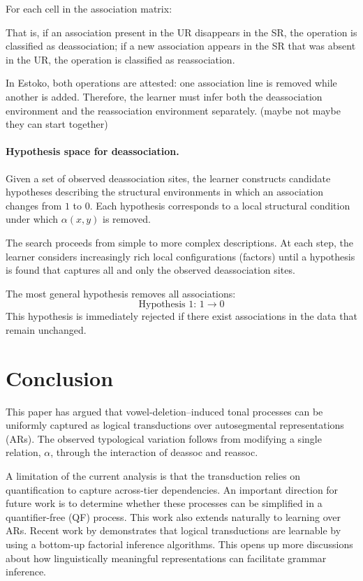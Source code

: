 \documentclass[pmlr]{jmlr}%
\begin{document}
For each cell in the association matrix:


That is, if an association present in the UR disappears in the SR, the
operation is classified as deassociation; if a new association appears
in the SR that was absent in the UR, the operation is classified as
reassociation.

In Estoko, both operations are attested: one association line is
removed while another is added. Therefore, the learner must infer both
the deassociation environment and the reassociation environment
separately. (maybe not maybe they can start together)
\paragraph{Hypothesis space for deassociation.}

Given a set of observed deassociation sites, the learner constructs
candidate hypotheses describing the structural environments in which an
association changes from $1$ to $0$. Each hypothesis corresponds to a
local structural condition under which $\alpha(x,y)$ is removed.

The search proceeds from simple to more complex descriptions. At each
step, the learner considers increasingly rich local configurations
(factors) until a hypothesis is found that captures all and only the
observed deassociation sites.

The most general hypothesis removes all associations:
\[
\text{Hypothesis 1: } 1 \rightarrow 0
\]
This hypothesis is immediately rejected if there exist associations in
the data that remain unchanged.


\section{Conclusion} This paper has argued that vowel-deletion–induced 
tonal processes can be uniformly captured as logical transductions 
over autosegmental representations (ARs). The observed typological 
variation follows from modifying a single relation, $\alpha$, through 
the interaction of \textsf{deassoc} and \textsf{reassoc}. 

A limitation of the current analysis is that the transduction relies 
on quantification to capture across-tier dependencies. An important 
direction for future work is to determine whether these processes can 
be simplified in a quantifier-free (QF) process.
This work also extends naturally to learning over ARs. Recent work 
by \citet{yolyan2025logical} demonstrates that logical transductions 
are learnable by using a bottom-up factorial inference algorithms\citep{chandleeBufia2019}. This opens up more discussions about how linguistically meaningful 
representations can facilitate grammar inference.




\end{document}
